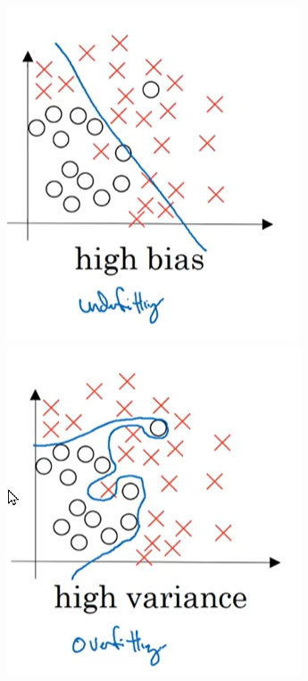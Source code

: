 \begin{figure}[htbp] %
    
    \begin{minipage}[t]{0.3\textwidth}
        \includegraphics[width=\linewidth, valign=t]{images/high_bias.png}
    \end{minipage}
    \hfill %
    \begin{minipage}[t]{0.3\textwidth}
        \includegraphics[width=\linewidth, valign=t]{images/high_variance.png}

\end{minipage}
\end{figure}
